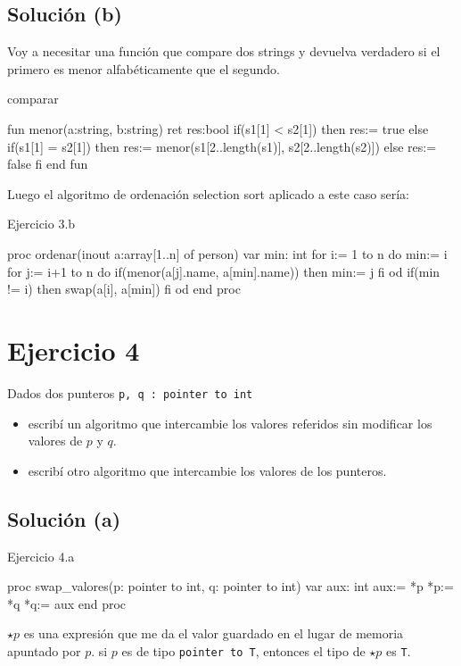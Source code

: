 \subsection{Solución (b)}
Voy a necesitar una función que compare dos strings y devuelva verdadero si el primero es menor alfabéticamente que el segundo.

\begin{codebox}{comparar}
\begin{pascallike}
fun menor(a:string, b:string) ret res:bool
if(s1[1] < s2[1]) then res:= true
else if(s1[1] = s2[1]) then
    res:= menor(s1[2..length(s1)], s2[2..length(s2)])
else res:= false
fi
end fun
\end{pascallike}
\end{codebox}
Luego el algoritmo de ordenación selection sort aplicado a este caso sería:

\begin{codebox}{Ejercicio 3.b}
\begin{pascallike}
proc ordenar(inout a:array[1..n] of person)
var min: int
for i:= 1 to n do
    min:= i
    for j:= i+1 to n do
        if(menor(a[j].name, a[min].name)) then
            min:= j
        fi
    od
    if(min != i) then
        swap(a[i], a[min])
    fi
od
end proc
\end{pascallike}
\end{codebox}

\section{Ejercicio 4}
Dados dos punteros \texttt{p, q : pointer to int}
\begin{itemize}
    \item[(a)] escribí un algoritmo que intercambie los valores referidos sin modificar los valores de $p$ y $q$.
    \item[(b)] escribí otro algoritmo que intercambie los valores de los punteros.
\end{itemize}

\subsection{Solución (a)}
\begin{codebox}{Ejercicio 4.a}
\begin{pascallike}
proc swap_valores(p: pointer to int, q: pointer to int)
var aux: int
aux:= *p
*p:= *q
*q:= aux
end proc
\end{pascallike}
\end{codebox}
$\star p$ es una expresión que me da el valor guardado en el lugar de memoria apuntado por $p$. si $p$ es de tipo \texttt{pointer to T}, entonces el tipo de $\star p$ es \texttt{T}.

